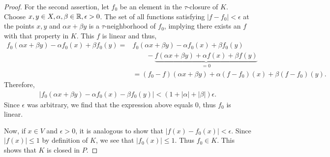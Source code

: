 \begin{proof}
	For the second assertion, let $f_0$ be an element in the $\tau$-closure of $K$. Choose $x,y\in X,\alpha,\beta\in \mathbb{R}, \epsilon>0$. The set of all functions satisfying $|f-f_0|<\epsilon$ at the points $x, y$ and $\alpha x+\beta y$ is a $\tau$-neighborhood of $f_0$, implying there exists an $f$ with that property in $K$. This $f$ is linear and thus,
	\begin{align*}
	f_0(\alpha x+\beta y)-\alpha f_0(x)+\beta f_0(y)=&f_0(\alpha x+\beta y)-\alpha f_0(x)+\beta f_0(y)\\
	&\qquad-\underset{=0}{\underbrace{f(\alpha x+\beta y)+\alpha f(x)+\beta f(y)}}\\
	&=(f_0-f)(\alpha x+\beta y)+\alpha (f-f_0)(x)+\beta (f-f_0)(y).
	\end{align*}
	Therefore,
	\begin{align*}
		|f_0(\alpha x+\beta y)-\alpha f_0(x)-\beta f_0(y)|<(1+|\alpha|+|\beta|)\epsilon.
	\end{align*}
	Since $\epsilon$ was arbitrary, we find that the expression above equals $0$, thus $f_0$ is linear.
	
	Now, if $x\in V$ and $\epsilon >0$, it is analogous to show that $|f(x)-f_0(x)|<\epsilon$. Since $|f(x)|\leq 1$ by definition of $K$, we see that $|f_0(x)|\leq 1$. Thus $f_0\in K$. This shows that $K$ is closed in $P$.
\setcounter{assertion}{0}
\end{proof}

